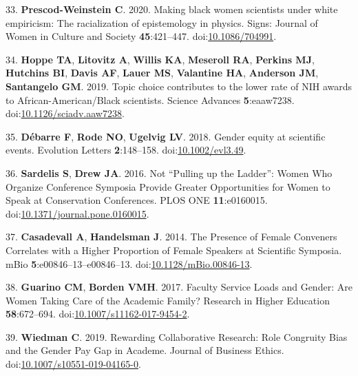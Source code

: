 \documentclass[11pt,]{article}
\begin{document}
\leavevmode\hypertarget{ref-PrescodWeinstein2020}{}%
33. \textbf{Prescod-Weinstein C}. 2020. Making black women scientists
under white empiricism: The racialization of epistemology in physics.
Signs: Journal of Women in Culture and Society \textbf{45}:421--447.
doi:\href{https://doi.org/10.1086/704991}{10.1086/704991}.

\leavevmode\hypertarget{ref-Hoppe2019}{}%
34. \textbf{Hoppe TA}, \textbf{Litovitz A}, \textbf{Willis KA},
\textbf{Meseroll RA}, \textbf{Perkins MJ}, \textbf{Hutchins BI},
\textbf{Davis AF}, \textbf{Lauer MS}, \textbf{Valantine HA},
\textbf{Anderson JM}, \textbf{Santangelo GM}. 2019. Topic choice
contributes to the lower rate of NIH awards to African-American/Black
scientists. Science Advances \textbf{5}:eaaw7238.
doi:\href{https://doi.org/10.1126/sciadv.aaw7238}{10.1126/sciadv.aaw7238}.

\leavevmode\hypertarget{ref-debarre_gender_2018}{}%
35. \textbf{Débarre F}, \textbf{Rode NO}, \textbf{Ugelvig LV}. 2018.
Gender equity at scientific events. Evolution Letters
\textbf{2}:148--158.
doi:\href{https://doi.org/10.1002/evl3.49}{10.1002/evl3.49}.

\leavevmode\hypertarget{ref-sardelis_not_2016}{}%
36. \textbf{Sardelis S}, \textbf{Drew JA}. 2016. Not ``Pulling up the
Ladder'': Women Who Organize Conference Symposia Provide Greater
Opportunities for Women to Speak at Conservation Conferences. PLOS ONE
\textbf{11}:e0160015.
doi:\href{https://doi.org/10.1371/journal.pone.0160015}{10.1371/journal.pone.0160015}.

\leavevmode\hypertarget{ref-casadevall_presence_2014}{}%
37. \textbf{Casadevall A}, \textbf{Handelsman J}. 2014. The Presence of
Female Conveners Correlates with a Higher Proportion of Female Speakers
at Scientific Symposia. mBio \textbf{5}:e00846--13--e00846--13.
doi:\href{https://doi.org/10.1128/mBio.00846-13}{10.1128/mBio.00846-13}.

\leavevmode\hypertarget{ref-guarino_faculty_2017}{}%
38. \textbf{Guarino CM}, \textbf{Borden VMH}. 2017. Faculty Service
Loads and Gender: Are Women Taking Care of the Academic Family? Research
in Higher Education \textbf{58}:672--694.
doi:\href{https://doi.org/10.1007/s11162-017-9454-2}{10.1007/s11162-017-9454-2}.

\leavevmode\hypertarget{ref-wiedman_rewarding_2019}{}%
39. \textbf{Wiedman C}. 2019. Rewarding Collaborative Research: Role
Congruity Bias and the Gender Pay Gap in Academe. Journal of Business
Ethics.
doi:\href{https://doi.org/10.1007/s10551-019-04165-0}{10.1007/s10551-019-04165-0}.
\end{document}
